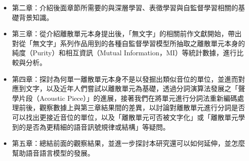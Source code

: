 \begin{itemize} \itemsep -2pt
  \item 第二章：介紹後面章節所需要的與深層學習、表徵學習與自監督學習相關的基礎背景知識。
  \item 第三章：從介紹離散單元本身提出後，「無文字」的相關前作文獻開始，帶出對從「無文字」系列作品用到的各種自監督學習模型所抽取之離散單元本身的純度（Purity）和相互資訊（Mutual Information，MI）等統計數據，進行比較與分析。
  \item 第四章：探討為何單一離散單元本身不是以發掘出類似音位的單位，並進而對應到文字，以及近年人們嘗試以離散單元為基礎，透過分詞演算法發展之「聲學片段（Acoustic Piece）\cite{ren_speech_2022}」的進展，接著我們在將單元進行分詞法重新編碼處理前後，觀察數據上與第三章結果間的差異，以討論對離散單元進行分詞是否可以找出更接近音位的單位，以及「離散單元可否被文字化」或「離散單元學到的是否為更精細的語音訊號規律或結構」等疑問。
  \item 第五章：總結前面的觀察結果，並進一步探討本研究還可以如何延伸，並怎麼幫助語音語言模型的發展。
\end{itemize}

